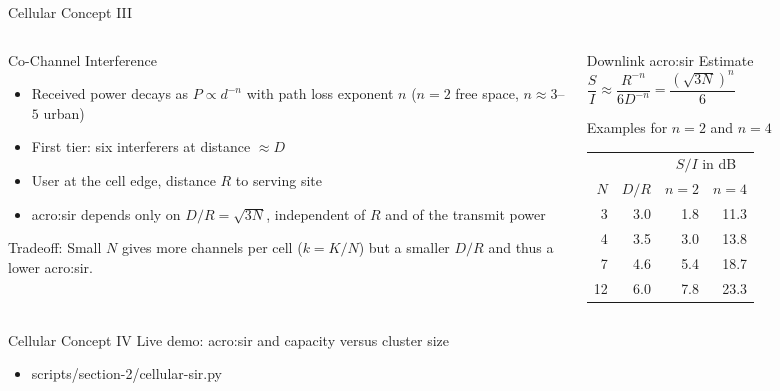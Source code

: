 \begin{frame}{Cellular Concept III}
  \begin{columns}[T,onlytextwidth]
    \begin{column}{0.54\textwidth}
      Co-Channel Interference
      \begin{itemize}
        \item Received power decays as $P \propto d^{-n}$ with path loss exponent $n$ ($n=2$ free space, $n \approx 3$--$5$ urban)
        \item First tier: six interferers at distance $\approx D$
        \item User at the cell edge, distance $R$ to serving site
        \item \Gls{acro:sir} depends only on $D/R = \sqrt{3N}$, independent of $R$ and of the transmit power
      \end{itemize}
      \alert{Tradeoff:} Small $N$ gives more channels per cell ($k = K/N$) but a smaller $D/R$ and thus a lower \gls{acro:sir}.
    \end{column}
    \begin{column}{0.42\textwidth}
      \begin{block}{Downlink \gls{acro:sir} Estimate}
        \centering
        $\dfrac{S}{I} \approx \dfrac{R^{-n}}{6 D^{-n}} = \dfrac{\left(\sqrt{3N}\right)^n}{6}$
      \end{block}
      \begin{block}{Examples for $n = 2$ and $n = 4$}
        \centering
        \begin{tabular}{rrrr}
          \toprule
          & & \multicolumn{2}{c}{$S/I$ in dB} \\
          \cmidrule(l){3-4}
          $N$ & $D/R$ & $n=2$ & $n=4$ \\
          \midrule
          3  & 3.0 & 1.8 & 11.3 \\
          4  & 3.5 & 3.0 & 13.8 \\
          7  & 4.6 & 5.4 & 18.7 \\
          12 & 6.0 & 7.8 & 23.3 \\
          \bottomrule
        \end{tabular}
      \end{block}
    \end{column}
  \end{columns}
\end{frame}

\begin{frame}{Cellular Concept IV}
  \centering
  Live demo: \gls{acro:sir} and capacity versus cluster size
  \begin{itemize}
    \item scripts/section-2/cellular-sir.py
  \end{itemize}
\end{frame}

